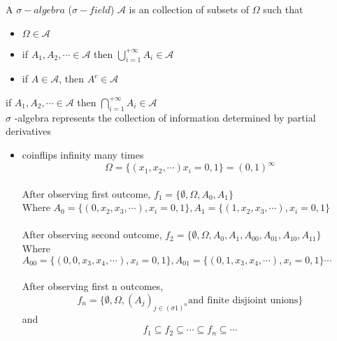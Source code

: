 \begin{definition}{}
A $ \sigma-algebra $ ($ \sigma-field $) $ \mathcal{A}  $  is an collection of subsets of $ \Omega $ such that
\begin{itemize}
\item $ \Omega \in \mathcal{A}  $
\item if $ A_1,A_2,\cdots \in \mathcal{A} $ then $ \bigcup_{i=1}^{+\infty}A_i \in \mathcal{A} $
\item if $ A \in \mathcal{A}  $, then $ A^c \in \mathcal{A} $ 
\end{itemize}
\end{definition}
\begin{remark}[]{}
if $ A_1,A_2,\cdots \in \mathcal{A} $ then $ \bigcap_{i=1}^{+\infty}A_i \in \mathcal{A} $
\\$ \sigma $ -algebra represents the collection of information determined by partial derivatives
\end{remark}
\begin{example}{}{}
\begin{itemize}
\item coinflips infinity many times$$
    \Omega=\{(x_1,x_2,\cdots )x_i=0,1\}={(0,1)}^{\infty}
$$ 
\\After observing first outcome, $ f_1=\{\emptyset,\Omega,A_0,A_1\} $
\\Where $A_0=\{(0,x_2,x_3,\cdots),x_i=0,1\},A_1=\{(1,x_2,x_3,\cdots),x_i=0,1\} $
\\
\\After observing second outcome, $ f_2=\{\emptyset,\Omega,A_0,A_1,A_{00},A_{01},A_{10},A_{11}\} $
\\Where $A_{00}=\{(0,0,x_3,x_4,\cdots),x_i=0,1\},A_{01}=\{(0,1,x_3,x_4,\cdots),x_i=0,1\} \cdots$
\\
\\After observing first n outcomes, $$ f_n=\{\emptyset,\Omega,{(A_j)}_{j\in {(\sigma 1)}^n} \text{and finite disjioint unions}\}$$
and $$
    f_1\subseteq f_2\subseteq \cdots \subseteq f_n \subseteq \cdots
$$ 
\end{itemize}
\end{example}
